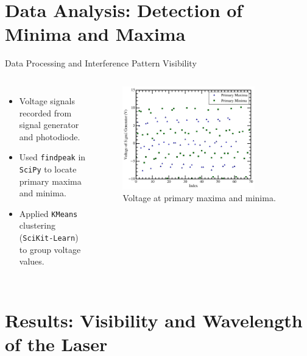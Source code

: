 \documentclass[aspectratio = 169]{beamer}
\begin{document}
\section{Data Analysis: Detection of Minima and Maxima}
\begin{frame}{Data Processing and Interference Pattern Visibility}
\begin{columns}
    \begin{itemize}
        \item Voltage signals recorded from signal generator and photodiode.
        \item Used \texttt{findpeak} in \texttt{SciPy} to locate primary maxima and minima.
        \item Applied \texttt{KMeans} clustering (\texttt{SciKit-Learn}) to group voltage values.
    \end{itemize}
    
        \begin{figure}
        \centering
        \includegraphics[width=0.8\textwidth]{fig/Primary_Maxima_Minima.png}
    \caption{Voltage at primary maxima and minima.}
    \end{figure}
\end{columns}

\end{frame}

\section{Results: Visibility and Wavelength of the Laser}
\end{document}

